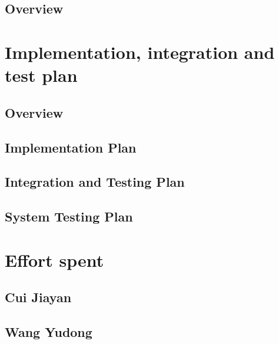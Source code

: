 \documentclass[10pt,english, openany]{book}
\begin{document}
\section{Overview}



\chapter{Implementation, integration and test plan}

\section{Overview}



\section{Implementation Plan}



\section{Integration and Testing Plan}



\section{System Testing Plan}



\chapter{Effort spent}

\section{Cui Jiayan}



\section{Wang Yudong}




\pagebreak
\end{document}
